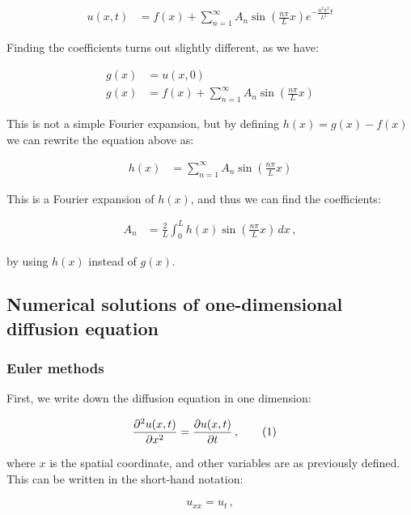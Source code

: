 \documentclass[reprint,english,notitlepage]{revtex4-1}  %
\newcommand\numberthis{\addtocounter{equation}{1}\tag{\theequation}}
\begin{document}
\begin{align*}
u(x,t) &= f(x) + \sum\limits_{n=1}^\infty A_n \sin( \frac{n\pi}{L} x) e^{-\frac{n^2 \pi^2}{L^2} t}
\end{align*}

Finding the coefficients turns out slightly different, as we have:

\begin{align*}
g(x) &= u(x,0) \\
g(x) &= f(x) + \sum\limits_{n=1}^\infty A_n \sin( \frac{n\pi}{L} x)
\end{align*}

This is not a simple Fourier expansion, but by defining $h(x) = g(x) - f(x)$ we can rewrite the equation above as:

\begin{align*}
h(x) &= \sum\limits_{n=1}^\infty A_n \sin( \frac{n\pi}{L} x)
\end{align*}

This is a Fourier expansion of $h(x)$, and thus we can find the coefficients:

\begin{align*}
A_n &= \frac{2}{L} \int_0^L h(x) \sin (\frac{n\pi}{L} x) \, dx \, ,
\end{align*}

by using $h(x)$ instead of $g(x)$. 


\subsection{Numerical solutions of one-dimensional diffusion equation} \label{sec:formalism_numerical_1D}

\subsubsection{Euler methods} \label{sec:formalism_euler_methods}

First, we write down the diffusion equation in one dimension:

\begin{align*}
\frac{\partial^2 u(x,t)}{\partial x ^2} &= \frac{\partial u(x,t)}{\partial t} \, , \numberthis \label{eq:1D_diff_eq}
\end{align*}

where $x$ is the spatial coordinate, and other variables are as previously defined. This can be written in the short-hand notation:

\begin{align*}
u_{xx} = u_t \, ,
\end{align*}
\end{document}
